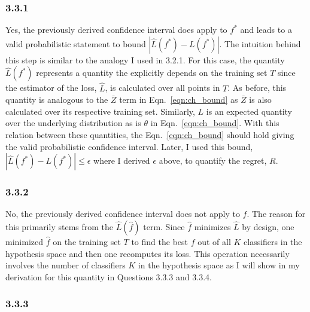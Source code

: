 \documentclass[12pt]{amsart}
\begin{document}
\subsubsection*{3.3.1}

Yes, the previously derived confidence interval does apply to $f^*$ and leads to a valid probabilistic statement to bound $|\hat{L}(f^*) - L(f^*)|$.  The intuition behind this step is similar to the analogy I used in 3.2.1.  For this case, the quantity $\hat{L}(f^*)$ represents a quantity the explicitly depends on the training set $T$ since the estimator of the loss, $\hat{L}$, is calculated over all points in $T$.  As before, this quantity is analogous to the $\bar{Z}$ term in Eqn.~\ref{eqn:ch_bound} as $\bar{Z}$ is also calculated over its respective training set.  Similarly, $L$ is an expected quantity over the underlying distribution as is $\theta$ in Eqn.~\ref{eqn:ch_bound}.  With this relation between these quantities, the Eqn.~\ref{eqn:ch_bound} should hold giving the valid probabilistic confidence interval.  Later, I used this bound, $|\hat{L}(f^*) - L(f^*)| \leq \epsilon$ where I derived $\epsilon$ above, to quantify the regret, $R$. 

\subsubsection*{3.3.2}

No, the previously derived confidence interval does not apply to $\hat{f}$.  The reason for this primarily stems from the $\hat{L}(\hat{f})$ term.  Since $\hat{f}$ minimizes $\hat{L}$ by design, one minimized $\hat{f}$ on the training set $T$ to find the best $f$ out of all $K$ classifiers in the hypothesis space and then one recomputes its loss.  This operation necessarily involves the number of classifiers $K$ in the hypothesis space as I will show in my derivation for this quantity in Questions 3.3.3 and 3.3.4.

\subsubsection*{3.3.3}
\end{document}
